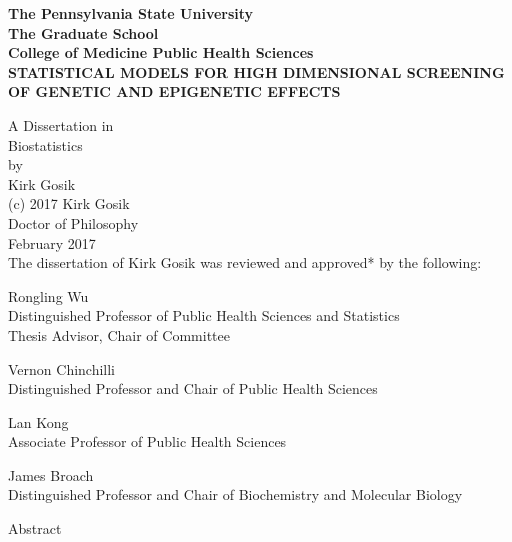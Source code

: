 \documentclass[11pt,]{book}
\title{}
\author{}
\date{}
\theoremstyle{definition}
\theoremstyle{definition}
\theoremstyle{remark}
\begin{document}
\begin{center}
\bf{The Pennsylvania State University} \\
The Graduate School \\
College of Medicine Public Health Sciences \\

STATISTICAL MODELS FOR HIGH DIMENSIONAL SCREENING OF GENETIC AND EPIGENETIC EFFECTS

A Dissertation in \\
Biostatistics \\
by \\
Kirk Gosik \\
(c) 2017 Kirk Gosik \\

Doctor of Philosophy \\
February 2017 \\

\newpage
{}
\setcounter{page}{2}
The dissertation of Kirk Gosik was reviewed and approved* by the following:

Rongling Wu \\
Distinguished Professor of Public Health Sciences and Statistics \\
Thesis Advisor, Chair of Committee

Vernon Chinchilli \\
Distinguished Professor and Chair of Public Health Sciences


Lan Kong \\
Associate Professor of Public Health Sciences

James Broach \\
Distinguished Professor and Chair of Biochemistry and Molecular Biology \\


\newpage

Abstract


\end{center}
\end{document}
